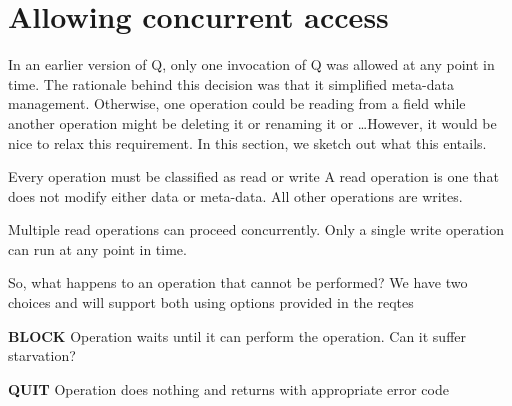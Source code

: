 \section{Allowing concurrent access}
\label{Concurrency}

In an earlier version of Q, only one invocation of Q was allowed at any
point in time. The rationale behind this decision was that it simplified
meta-data management. Otherwise, one operation could be reading from a
field while another operation might be deleting it or renaming it or
\ldots However, it would be nice to relax this requirement. In this
section, we sketch out what this entails.

Every operation must be classified as read or write
A read operation is one that does not modify either data or meta-data.
All other operations are writes.

Multiple read operations can proceed concurrently.
Only a single write operation can run at any point in time.

So, what happens to an operation that cannot be performed?
We have two choices and will support both using
options provided in the reqtes
\be
\item {\bf BLOCK} Operation waits until it can perform the
operation. Can it suffer starvation? \TBC
\item {\bf QUIT}  Operation does nothing and returns with appropriate error
code
\ee

